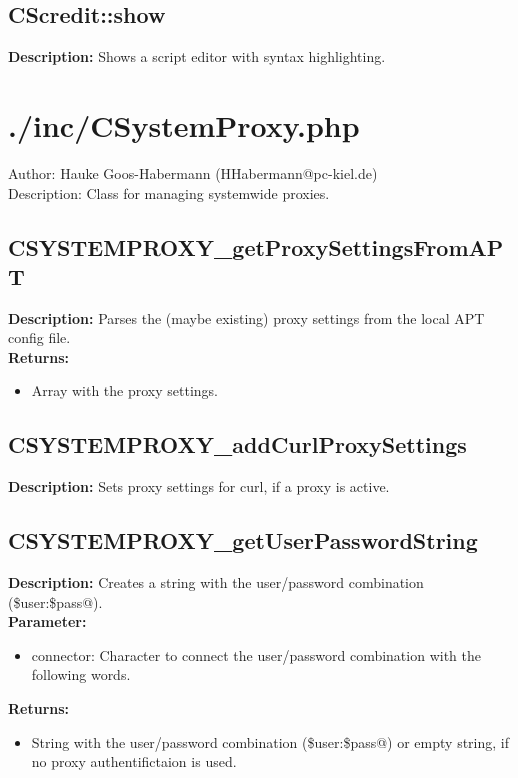 \subsection{CScredit::show}
\textbf{Description:} Shows a script editor with syntax highlighting.\\

\newpage\section{./inc/CSystemProxy.php}
 Author: Hauke Goos-Habermann (HHabermann@pc-kiel.de)\\
 Description: Class for managing systemwide proxies.\\

\subsection{CSYSTEMPROXY\_getProxySettingsFromAPT}
\textbf{Description:} Parses the (maybe existing) proxy settings from the local APT config file.\\
\textbf{Returns:}
\begin{itemize}
\item Array with the proxy settings.
\end{itemize}

\subsection{CSYSTEMPROXY\_addCurlProxySettings}
\textbf{Description:} Sets proxy settings for curl, if a proxy is active.\\

\subsection{CSYSTEMPROXY\_getUserPasswordString}
\textbf{Description:} Creates a string with the user/password combination (\$user:\$pass@).\\
\textbf{Parameter:}
\begin{itemize}
\item connector: Character to connect the user/password combination with the following words.
\end{itemize}
\textbf{Returns:}
\begin{itemize}
\item String with the user/password combination (\$user:\$pass@) or empty string, if no proxy authentifictaion is used.
\end{itemize}

